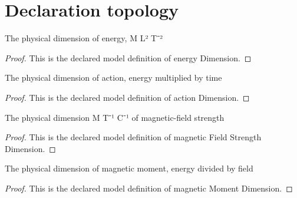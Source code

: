 \section{Declaration topology}
\begin{definition}
  \label{def:physics:phyx-mini-0578:phyxminiproblems-problemphyxmini0578-energydimension}
  The physical dimension of energy, M L² T⁻²
\end{definition}
\begin{proof}
  This is the declared model definition of energy Dimension.
\end{proof}
\begin{definition}
  \label{def:physics:phyx-mini-0578:phyxminiproblems-problemphyxmini0578-actiondimension}
  The physical dimension of action, energy multiplied by time
\end{definition}
\begin{proof}
  This is the declared model definition of action Dimension.
\end{proof}
\begin{definition}
  \label{def:physics:phyx-mini-0578:phyxminiproblems-problemphyxmini0578-magneticfieldstrengthdimension}
  The physical dimension M T⁻¹ C⁻¹ of magnetic-field strength
\end{definition}
\begin{proof}
  This is the declared model definition of magnetic Field Strength Dimension.
\end{proof}
\begin{definition}
  \label{def:physics:phyx-mini-0578:phyxminiproblems-problemphyxmini0578-magneticmomentdimension}
  The physical dimension of magnetic moment, energy divided by field
\end{definition}
\begin{proof}
  This is the declared model definition of magnetic Moment Dimension.
\end{proof}

